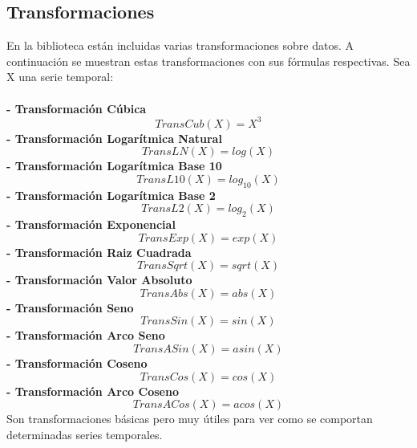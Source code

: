 \documentclass[14pt]{extarticle}
\theoremstyle{definition}
\theoremstyle{remark}
\begin{document}
\subsection{Transformaciones}\label{sec:transformaciones}
En la biblioteca están incluidas varias transformaciones sobre datos. A continuación se muestran estas transformaciones con sus fórmulas respectivas. Sea X una serie temporal:\\\\
\textbf{- Transformación Cúbica}\\
\[TransCub(X) = X^3\]
\textbf{- Transformación Logarítmica Natural}\\
\[TransLN(X) = log(X)\]
\textbf{- Transformación Logarítmica Base 10}\\
\[TransL10(X) = log_{10}(X)\]
\textbf{- Transformación Logarítmica Base 2}\\
\[TransL2(X) = log_{2}(X)\]
\textbf{- Transformación Exponencial}\\
\[TransExp(X) = exp(X)\]
\textbf{- Transformación Raiz Cuadrada}\\
\[TransSqrt(X) = sqrt(X)\]
\textbf{- Transformación Valor Absoluto}\\
\[TransAbs(X) = abs(X)\]
\textbf{- Transformación Seno}\\
\[TransSin(X) = sin(X)\]
\textbf{- Transformación Arco Seno}\\
\[TransASin(X) = asin(X)\]
\textbf{- Transformación Coseno}\\
\[TransCos(X) = cos(X)\]
\textbf{- Transformación Arco Coseno}\\
\[TransACos(X) = acos(X)\]
Son transformaciones básicas pero muy útiles para ver como se comportan determinadas series temporales.
\end{document}
